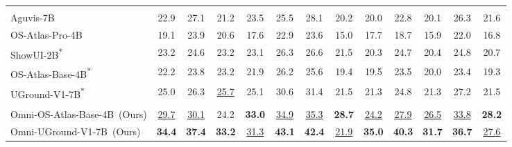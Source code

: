 \documentclass[letterpaper]{article} %
\begin{document}
\begin{table}[h!]
{\begin{tabular}{lcccccccccccc}
  \rowcolor{green!20} 
 \multicolumn{13}{c}{\textit{Visual Digital Agents~(Screenshot)}} \\
 Aguvis-7B~\cite{aguvis} & 22.9 & {27.1} & 21.2 & 23.5 & 25.5 & 28.1 & 20.2 & 20.0 & 22.8 & 20.1 & 26.3 & 21.6 \\
 OS-Atlas-Pro-4B~\cite{os-atlas} & {19.1} & 23.9 & 20.6 & 17.6 & 22.9 & 23.6 & 15.0 & 17.7 & 18.7 & 15.9 & 22.0 & 16.8 \\
 ShowUI-2B\textsuperscript{*}~\cite{showui} & 23.2 & 24.6 & 23.2 & 23.1 & 26.3 & 26.6 & 21.5 & 20.3 & 24.7 & 20.4 & 24.8 & 20.7 \\
 OS-Atlas-Base-4B\textsuperscript{*}~\cite{os-atlas} & 22.2 & 23.8 & 23.2 & 21.9 & 26.2 & 25.6 & 19.4 & 19.5 & 23.5 & 20.0 & 23.4 & 19.3 \\
 UGround-V1-7B\textsuperscript{*}~\cite{uground} & 25.0 & 26.3 & \underline{25.7} & {25.1} & 30.6 & {31.4} & 21.5 & 21.3 & {24.8} & 21.3 & 27.2 & {21.5} \\
  \rowcolor{purple!20}
 \multicolumn{13}{c}{\textit{Supervised Fine-Tuning Agents~(Screenshot)}} \\
  Omni-OS-Atlas-Base-4B~(Ours) & \underline{29.7} & \underline{30.1} & 24.2 & \textbf{33.0} & \underline{34.9} & \underline{35.3} & \textbf{28.7} & \underline{24.2} & \underline{27.9} & \underline{26.5} & \underline{33.8} & \textbf{28.2} \\
 Omni-UGround-V1-7B~(Ours)  & \textbf{34.4} & \textbf{37.4} & \textbf{33.2} & \underline{31.3} & \textbf{43.1} & \textbf{42.4} & \underline{21.9} & \textbf{35.0} & \textbf{40.3} & \textbf{31.7} & \textbf{36.7} & \underline{27.6} \\
 
\bottomrule
\end{tabular}
}
\label{maintable}
\vspace{-7mm}
\end{table}
\end{document}
